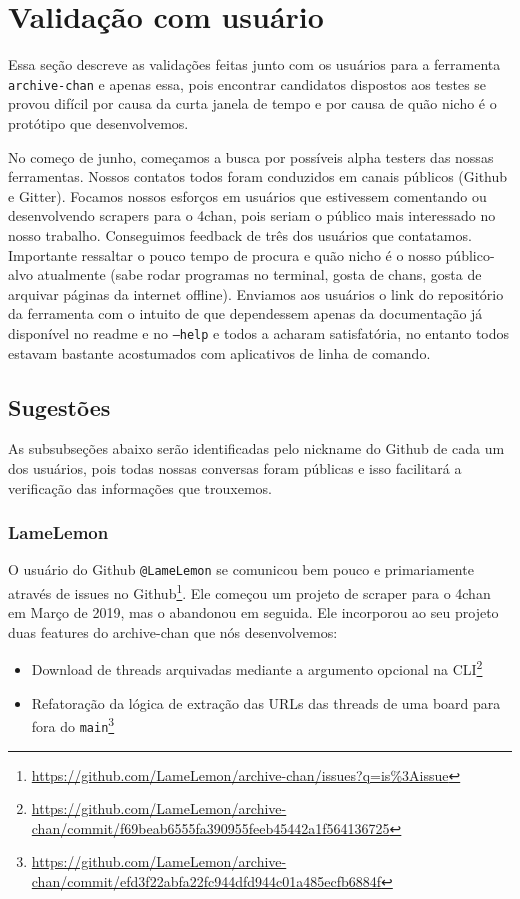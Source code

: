 \section{Validação com usuário}\label{sec:val-usr}

Essa seção descreve as validações feitas junto com os usuários para a ferramenta \texttt{archive-chan} e apenas essa, pois encontrar candidatos dispostos aos testes se provou difícil por causa da curta janela de tempo e por causa de quão nicho é o protótipo que desenvolvemos.

No começo de junho, começamos a busca por possíveis alpha testers das nossas ferramentas.
Nossos contatos todos foram conduzidos em canais públicos (Github e Gitter).
Focamos nossos esforços em usuários que estivessem comentando ou desenvolvendo scrapers para o 4chan, pois seriam o público mais interessado no nosso trabalho.
Conseguimos feedback de três dos usuários que contatamos.
Importante ressaltar o pouco tempo de procura e quão nicho é o nosso público-alvo atualmente (sabe rodar programas no terminal, gosta de chans, gosta de arquivar páginas da internet offline).
Enviamos aos usuários o link do repositório da ferramenta com o intuito de que dependessem apenas da documentação já disponível no readme e no \texttt{--help} e todos a acharam satisfatória, no entanto todos estavam bastante acostumados com aplicativos de linha de comando.

\subsection{Sugestões}

As subsubseções abaixo serão identificadas pelo nickname do Github de cada um dos usuários, pois todas nossas conversas foram públicas e isso facilitará a verificação das informações que trouxemos.

\subsubsection{LameLemon}

O usuário do Github \texttt{@LameLemon} se comunicou bem pouco e primariamente através de issues no Github\footnote{\url{https://github.com/LameLemon/archive-chan/issues?q=is\%3Aissue}}.
Ele começou um projeto de scraper para o 4chan em Março de 2019, mas o abandonou em seguida.
Ele incorporou ao seu projeto duas features do archive-chan que nós desenvolvemos:

\begin{itemize}
    \item Download de threads arquivadas mediante a argumento opcional na CLI\footnote{\url{https://github.com/LameLemon/archive-chan/commit/f69beab6555fa390955feeb45442a1f564136725}}
    \item Refatoração da lógica de extração das URLs das threads de uma board para fora do \texttt{main}\footnote{\url{https://github.com/LameLemon/archive-chan/commit/efd3f22abfa22fc944dfd944c01a485ecfb6884f}}
\end{itemize}

